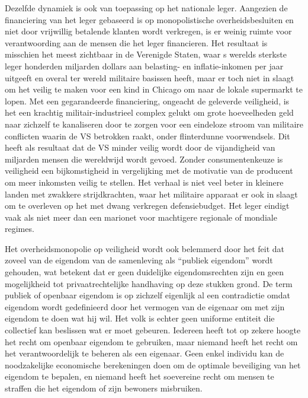 Dezelfde dynamiek is ook van toepassing op het nationale leger. Aangezien de financiering van het leger gebaseerd is op monopolistische overheidsbesluiten en niet door vrijwillig betalende klanten wordt verkregen, is er weinig ruimte voor verantwoording aan de mensen die het leger financieren. Het resultaat is misschien het meest zichtbaar in de Verenigde Staten, waar \textquotesingle s werelds sterkste leger honderden miljarden dollars aan belasting- en inflatie-inkomen per jaar uitgeeft en overal ter wereld militaire basissen heeft, maar er toch niet in slaagt om het veilig te maken voor een kind in Chicago om naar de lokale supermarkt te lopen. Met een gegarandeerde financiering, ongeacht de geleverde veiligheid, is het een krachtig militair-industrieel complex gelukt om grote hoeveelheden geld naar zichzelf te kanaliseren door te zorgen voor een eindeloze stroom van militaire conflicten waarin de VS betrokken raakt, onder flinterdunne voorwendsels. Dit heeft als resultaat dat de VS minder veilig wordt door de vijandigheid van miljarden mensen die wereldwijd wordt gevoed. Zonder consumentenkeuze is veiligheid een bijkomstigheid in vergelijking met de motivatie van de producent om meer inkomsten veilig te stellen. Het verhaal is niet veel beter in kleinere landen met zwakkere strijdkrachten, waar het militaire apparaat er ook in slaagt om te overleven op het met dwang verkregen defensiebudget. Het leger eindigt vaak als niet meer dan een marionet voor machtigere regionale of mondiale regimes.

Het overheidsmonopolie op veiligheid wordt ook belemmerd door het feit dat zoveel van de eigendom van de samenleving als ``publiek eigendom'' wordt gehouden, wat betekent dat er geen duidelijke eigendomsrechten zijn en geen mogelijkheid tot privaatrechtelijke handhaving op deze stukken grond. De term publiek of openbaar eigendom is op zichzelf eigenlijk al een contradictie omdat eigendom wordt gedefinieerd door het vermogen van de eigenaar om met zijn eigendom te doen wat hij wil. Het volk is echter geen uniforme entiteit die collectief kan beslissen wat er moet gebeuren. Iedereen heeft tot op zekere hoogte het recht om openbaar eigendom te gebruiken, maar niemand heeft het recht om het verantwoordelijk te beheren als een eigenaar. Geen enkel individu kan de noodzakelijke economische berekeningen doen om de optimale beveiliging van het eigendom te bepalen, en niemand heeft het soevereine recht om mensen te straffen die het eigendom of zijn bewoners misbruiken.\autocite{208}

